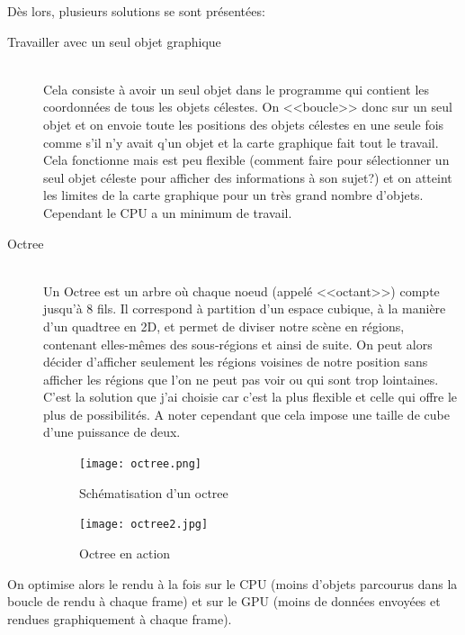 \documentclass[a4paper,french,12pt]{article}
\begin{document}
		  Dès lors, plusieurs solutions se sont présentées:
		  
		  \begin{description}
		  \item [Travailler avec un seul objet graphique]~\\ Cela consiste à avoir un seul objet dans le programme qui 
		  contient les coordonnées de tous les objets célestes. On <<boucle>> donc sur un seul objet et on envoie toute
		  les positions des objets célestes en une seule fois comme s'il n'y avait q'un objet et la carte
		  graphique fait tout le travail. Cela fonctionne mais est peu flexible (comment faire pour sélectionner
		  un seul objet céleste pour afficher des informations à son sujet?) et on atteint les limites de la
		  carte graphique pour un très grand nombre d'objets. Cependant le CPU a un minimum de travail.
		  
		  \item [Octree]~\\ Un Octree est un arbre où chaque noeud (appelé <<octant>>) compte jusqu'à 8 fils. Il correspond à partition
		  d'un espace cubique, à la manière d'un quadtree en 2D, et permet de diviser notre scène en régions,
		  contenant elles-mêmes des sous-régions et ainsi de suite. On peut alors décider d'afficher seulement les
		  régions voisines de notre position sans afficher les régions que l'on ne peut pas voir ou qui sont
		  trop lointaines. C'est la solution que j'ai choisie car c'est la plus flexible et celle qui offre le
		  plus de possibilités. A noter cependant que cela impose une taille de cube d'une puissance de deux.
		  \FloatBarrier
		  \begin{figure}
			      \centering
				\texttt{[image: octree.png]}
			      \caption{Schématisation d'un octree}
			      
		   \end{figure} 
		    
		
			      
		\begin{figure} 
			\centering
				\texttt{[image: octree2.jpg]}
			      \caption{Octree en action}
		  
		\end{figure}
		  \FloatBarrier
		\end{description}

		  
		On optimise alors le rendu à la fois sur le CPU (moins d'objets parcourus dans la boucle
			      de rendu à chaque frame) et sur le GPU (moins de données envoyées et 
			      rendues graphiquement à chaque frame).  
				
\end{document}
